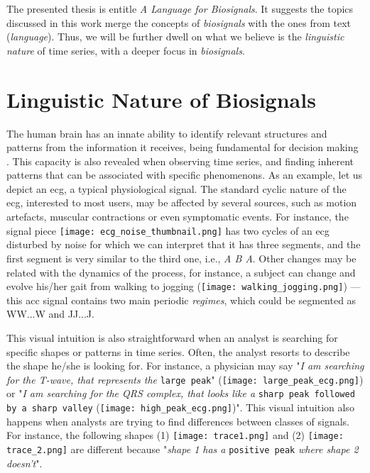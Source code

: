 The presented thesis is entitle \textit{A Language for Biosignals}. It suggests the topics discussed in this work merge the concepts of \textit{biosignals} with the ones from text (\textit{language}). Thus, we will be further dwell on what we believe is the \textit{linguistic nature} of time series, with a deeper focus in \textit{biosignals}.  

\section{Linguistic Nature of Biosignals} 
\label{sub:context1}

The human brain has an innate ability to identify relevant structures and patterns from the information it receives, being fundamental for decision making \cite{cognition}. This capacity is also revealed when observing time series, and finding inherent patterns that can be associated with specific phenomenons. 
As an example, let us depict an \gls{ecg}, a typical physiological signal. The standard cyclic nature of the \gls{ecg}, interested to most users, may be affected by several sources, such as motion artefacts, muscular contractions or even symptomatic events.
For instance, the signal piece \texttt{[image: ecg\_noise\_thumbnail.png]} has two cycles of an \textcolor{myblue}{\gls{ecg}} disturbed by \textcolor{myred}{noise} for which we can interpret that it has three segments, and the first segment is very similar to the third one, i.e., \textit{\textcolor{myblue}{A} \textcolor{myred}{B} \textcolor{myblue}{A}}. Other changes may be related with the dynamics of the process, for instance, a subject can change and evolve his/her gait from \textcolor{myblue}{walking} to \textcolor{mygreen}{jogging} (\texttt{[image: walking\_jogging.png]}) — this \gls{acc} signal contains two main periodic \textit{regimes}, which could be segmented as \textcolor{myblue}{WW...W} and \textcolor{mygreen}{JJ...J}.

This visual intuition is also straightforward when an analyst is searching for specific shapes or patterns in time series. Often, the analyst resorts to describe the shape he/she is looking for. For instance, a physician may say "\textit{I am searching for the T-wave, that represents the} \texttt{large peak}" (\texttt{[image: large\_peak\_ecg.png]}) or "\textit{I am searching for the QRS complex, that looks like a} \texttt{sharp peak followed by a sharp valley} (\texttt{[image: high\_peak\_ecg.png]})". This visual intuition also happens when analysts are trying to find differences between classes of signals. For instance, the following shapes (1) \texttt{[image: trace1.png]} and (2) \texttt{[image: trace\_2.png]} are different because "\textit{shape 1 has a} \texttt{positive peak} \textit{where shape 2 doesn't}". 

